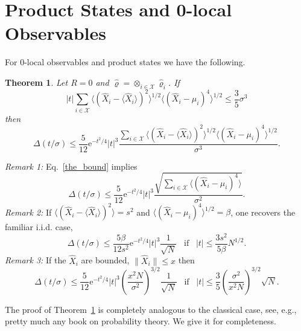 \documentclass[aps,10pt,epsfig,graphics,mathbbm]{article}
\newcommand{\me}{\mathrm{e}}
\newtheorem{theorem}{Theorem}
\begin{document}
\section{Product States and 0-local Observables}
For $0$-local observables and product states we have the following.
\begin{theorem} \label{0-local} Let $R=0$ and $\hat{\varrho}=\otimes_{i\in\mathcal{X}}\hat{\varrho}_i$. If
\begin{equation}
\label{t_condition}
|t|\sum_{i\in\mathcal{X}}\langle(\hat{X}_i-\langle\hat{X}_i\rangle)^2\rangle^{1/2}\langle (\hat{X}_i-\mu_i)^4\rangle^{1/2}
\le \frac{3}{5}\sigma^3
\end{equation}
then
\begin{equation}
\label{the_bound}
\Delta(t/\sigma)\le   \frac{5}{12}\me^{-t^2/4}|t|^3\frac{\sum_{i\in\mathcal{X}}\langle(\hat{X}_i-\langle\hat{X}_i\rangle)^2\rangle^{1/2}\langle (\hat{X}_i-\mu_i)^4\rangle^{1/2}}{\sigma^3}.
\end{equation}
\end{theorem}
{\it Remark 1:} Eq.~\eqref{the_bound} implies
\begin{equation}
\Delta(t/\sigma)\le   \frac{5}{12}\me^{-t^2/4}|t|^3\frac{\sqrt{\sum_{i\in\mathcal{X}}\langle (\hat{X}_i-\mu_i)^4\rangle}}{\sigma^2}.
\end{equation}
{\it Remark 2:} If $\langle(\hat{X}_i-\langle\hat{X}_i\rangle)^2\rangle=s^2$ and $\langle (\hat{X}_i-\mu_i)^4\rangle^{1/2}=\beta$, one recovers the familiar i.i.d. case,
\begin{equation}
\Delta(t/\sigma)\le   \frac{5\beta}{12 s^2}\me^{-t^2/4}|t|^3\frac{1}{\sqrt{N}}\;\;\;\text{if}\;\;\;|t|\le \frac{3s^2}{5\beta}N^{1/2}.
\end{equation}
{\it Remark 3:} If the $\hat{X}_i$ are bounded, $\|\hat{X}_i\|\le x$ then
\begin{equation}
\Delta(t/\sigma)\le \frac{5}{12}\me^{-t^2/4}|t|^3\left(\frac{x^2N}{\sigma^2}\right)^{3/2}\frac{1}{\sqrt{N}}  \;\;\;\text{if}\;\;\;|t|
\le \frac{3}{5}\left(\frac{\sigma^2}{x^2N}\right)^{3/2}\sqrt{N}.
\end{equation}

\noindent
The proof of Theorem~\ref{0-local} is completely analogous to the classical case, see, e.g., pretty much any book on probability theory. We give it for completeness.
\end{document}
